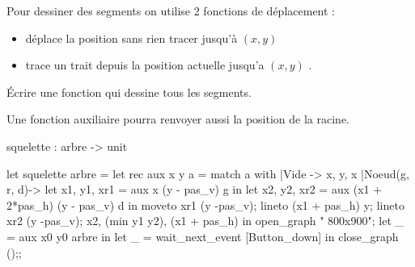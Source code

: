 \begin{minipage}{0.6\textwidth}
Pour dessiner des segments on utilise 2 fonctions de déplacement :

\begin{itemize}
  \item {} déplace la position sans rien tracer jusqu'à $(x,y)$
  \item {} trace un trait depuis la position actuelle jusqu'a $(x,y)$ .
\end{itemize}

\begin{question}{}{}
Écrire une fonction  qui dessine tous les segments.

Une fonction auxiliaire pourra renvoyer aussi la position de la racine.
\begin{ocaml}
squelette : arbre -> unit
\end{ocaml}

\reponse

\begin{ocaml}
let squelette arbre =
    let rec aux x y a =
        match a with
        |Vide -> x, y, x
        |Noeud(g, r, d)-> 
                let x1, y1, xr1 = aux x (y - pas_v) g in
                let x2, y2, xr2 = aux (x1 + 2*pas_h) 
                                      (y - pas_v) d in
                moveto xr1 (y -pas_v);
                lineto (x1 + pas_h) y;
                lineto xr2 (y -pas_v);
                x2, (min y1 y2), (x1 + pas_h) in
    open_graph " 800x900";
    let _ = aux x0 y0 arbre in
    let _ = wait_next_event [Button_down] in close_graph ();;
\end{ocaml}
\end{question}
\end{minipage}
\begin{minipage}{0.4\textwidth}
\begin{center}
\end{center}
\end{minipage}
